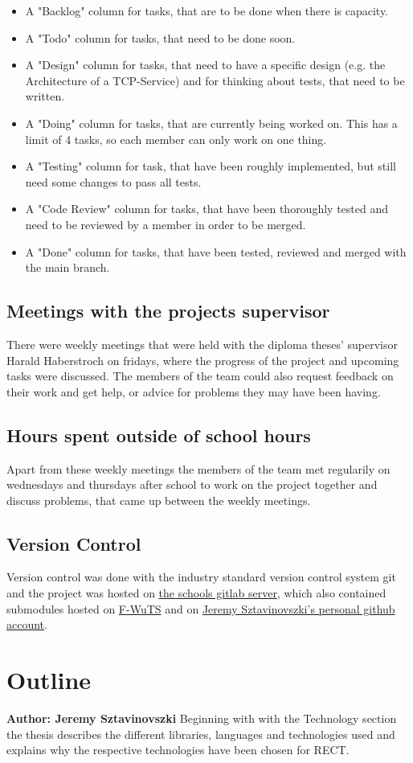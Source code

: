 \begin{itemize}
\item A "Backlog" column for tasks, that are to be done when there is capacity.
\item A "Todo" column for tasks, that need to be done soon.
\item A "Design" column for tasks, that need to have a specific design (e.g. the Architecture of a TCP-Service) and for thinking about tests, that need to be written.
\item A "Doing" column for tasks, that are currently being worked on. This has a limit of 4 tasks, so each member can only work on one thing.
\item A "Testing" column for task, that have been roughly implemented, but still need some changes to pass all tests.
\item A "Code Review" column for tasks, that have been thoroughly tested and need to be reviewed by a member in order to be merged.
\item A "Done" column for tasks, that have been tested, reviewed and merged with the main branch.
\end{itemize}

\subsection{Meetings with the projects supervisor}
There were weekly meetings that were held with the diploma theses' supervisor Harald Haberstroch on fridays, where the progress of the project and upcoming tasks were discussed.
The members of the team could also request feedback on their work and get help, or advice for problems they may have been having.

\subsection{Hours spent outside of school hours} 
Apart from these weekly meetings the members of the team met regularily on wednesdays and thursdays after school to work on the project together and discuss problems, 
that came up between the weekly meetings.

\subsection{Version Control}
Version control was done with the industry standard version control system git and the project was hosted on \href{https://gitlab.htlwrn.ac.at/Sztavinovszki.Jeremy/RECT}{the schools gitlab server}, 
which also contained submodules hosted on \href{https://github.com/F-WuTS/}{F-WuTS} and on \href{https://github.com/if-loop69420}{Jeremy Sztavinovszki's personal github account}.

\section{Outline}
\textbf{Author: Jeremy Sztavinovszki}
Beginning with with the Technology section the thesis describes the different libraries, languages and technologies used and explains why the respective technologies have been chosen for RECT.


\filbreak
